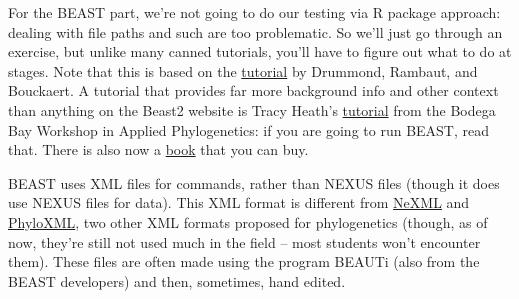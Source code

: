 \documentclass[]{article}
\theoremstyle{definition}
\theoremstyle{definition}
\theoremstyle{definition}
\theoremstyle{remark}
\begin{document}
For the BEAST part, we're not going to do our testing via R package
approach: dealing with file paths and such are too problematic. So we'll
just go through an exercise, but unlike many canned tutorials, you'll
have to figure out what to do at stages. Note that this is based on the
\href{https://github.com/CompEvol/beast2/blob/master/doc/tutorials/DivergenceDating/DivergenceDatingTutorialv2.0.3.pdf?raw=true}{tutorial}
by Drummond, Rambaut, and Bouckaert. A tutorial that provides far more
background info and other context than anything on the Beast2 website is
Tracy Heath's
\href{http://phyloworks.org/workshops/DivTime_BEAST2_tutorial_FBD.pdf}{tutorial}
from the Bodega Bay Workshop in Applied Phylogenetics: if you are going
to run BEAST, read that. There is also now a
\href{http://beast2.org/book/}{book} that you can buy.

BEAST uses XML files for commands, rather than NEXUS files (though it
does use NEXUS files for data). This XML format is different from
\href{http://www.nexml.org}{NeXML} and
\href{http://www.phyloxml.org}{PhyloXML}, two other XML formats proposed
for phylogenetics (though, as of now, they're still not used much in the
field -- most students won't encounter them). These files are often made
using the program BEAUTi (also from the BEAST developers) and then,
sometimes, hand edited.
\end{document}
